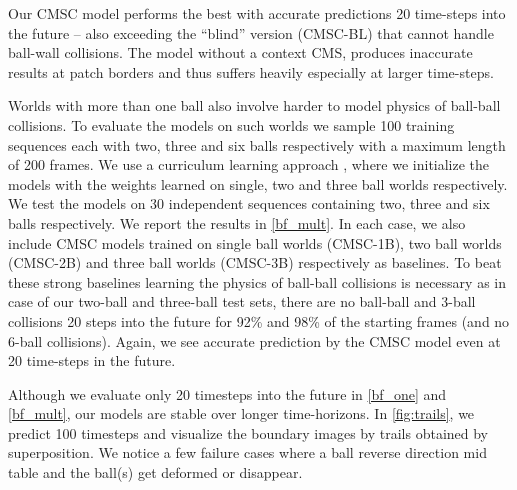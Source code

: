 Our CMSC model performs the best with accurate predictions 20 time-steps into the future -- also exceeding the ``blind'' version (CMSC-BL) that cannot handle ball-wall collisions. The model without a context CMS, produces inaccurate results at patch borders and thus suffers heavily especially at larger time-steps.

Worlds with more than one ball also involve harder to model physics of ball-ball collisions. To evaluate the models on such worlds we sample 100 training sequences each with two, three and six balls respectively with a maximum length of 200 frames. We use a curriculum learning approach \cite{bengio2009curriculum}, where we initialize the models with the weights learned on single, two and three ball worlds respectively.  We test the models on 30 independent sequences containing two, three and six balls respectively. We report the results in \autoref{bf_mult}. In each case, we also include CMSC models trained on single ball worlds (CMSC-1B), two ball worlds (CMSC-2B) and three ball worlds (CMSC-3B) respectively as baselines. To beat these strong baselines learning the physics of ball-ball collisions is necessary as in case of our two-ball and three-ball test sets, there are no ball-ball and 3-ball collisions 20 steps into the future for 92\% and 98\% of the starting frames (and no 6-ball collisions). Again, we see accurate prediction by the CMSC model even at 20 time-steps in the future.


Although we evaluate only 20 timesteps into the future in \autoref{bf_one} and \autoref{bf_mult}, our models are stable over longer time-horizons. In \autoref{fig:trails}, we predict 100 timesteps and visualize the boundary images by trails obtained by superposition. We notice a few failure cases where a ball reverse direction mid table and the ball(s) get deformed or disappear. 

\begin{table}[h]
\vspace{-0.5cm}
  \centering
   \caption{Evaluation on real billiard sequences (M-masked).}
  \label{bf_real}
\end{table}



